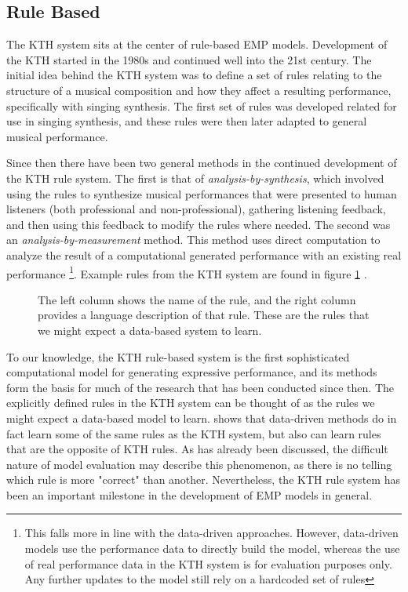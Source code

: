 \subsection{Rule Based}
The KTH system \cite{friberg2006overview} sits at the center of rule-based EMP models. Development of the KTH started in the 1980s and continued well into the 21st century. The initial idea behind the KTH system was to define a set of rules relating to the structure of a musical composition and how they affect a resulting performance, specifically with singing synthesis. The first set of rules was developed related for use in singing synthesis, and these rules were then later adapted to general musical performance. 

Since then there have been two general methods in the continued development of the KTH rule system. The first is that of \emph{analysis-by-synthesis}, which involved using the rules to synthesize musical performances that were presented to human listeners (both professional and non-professional), gathering listening feedback, and then using this feedback to modify the rules where needed. The second was an \emph{analysis-by-measurement} method. This method uses direct computation to analyze the result of a computational generated performance with an existing real performance \footnote{This falls more in line with the data-driven approaches. However, data-driven models use the performance data to directly build the model, whereas the use of real performance data in the KTH system is for evaluation purposes only. Any further updates to the model still rely on a hardcoded set of rules}. Example rules from the KTH system are found in figure \ref{fig:kth-rules} . 

\begin{figure}
    \centering
    \caption{The left column shows the name of the rule, and the right column provides a language description of that rule. These are the rules that we might expect a data-based system to learn.}
    \label{fig:kth-rules}
\end{figure}

To our knowledge, the KTH rule-based system is the first sophisticated computational model for generating expressive performance, and its methods form the basis for much of the research that has been conducted since then. The explicitly defined rules in the KTH system can be thought of as the rules we might expect a data-based model to learn. \citet{widmer2002machine} shows that data-driven methods do in fact learn some of the same rules as the KTH system, but also can learn rules that are the opposite of KTH rules. As has already been discussed, the difficult nature of model evaluation may describe this phenomenon, as there is no telling which rule is more "correct" than another. Nevertheless, the KTH rule system has been an important milestone in the development of EMP models in general. 

